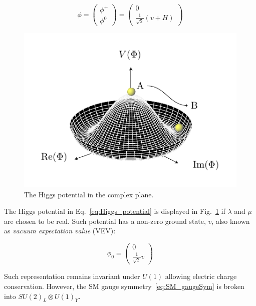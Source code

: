 			\begin{equation}
			\label{eq:Higgs_doublet}
				\phi = 
				\begin{pmatrix}
					\phi^+ \\ \phi^0
				\end{pmatrix} 
				=
				\begin{pmatrix}
					0 \\ \frac{1}{\sqrt{2}} \left ( v + H \right )
				\end{pmatrix}
			\end{equation}

			\begin{figure}
			\centering
				\includegraphics[width=.4\textwidth]{HiggsPotential/HiggsPotential}
			\caption{\label{fig:higgs_potential}The Higgs potential in the complex plane.} %
			\end{figure}

			The Higgs potential in Eq.~\ref{eq:Higgs_potential} is displayed in Fig.~\ref{fig:higgs_potential} if $\lambda$ and $\mu$ are chosen to be real. Such potential has a non-zero ground state, $v$, also known as \emph{vacuum expectation value} (VEV):

			\begin{equation}
			\label{eq:Higgs_vev}
				\phi_0 = 
				\begin{pmatrix}
					0 \\ \frac{1}{\sqrt{2}} v
				\end{pmatrix}
			\end{equation}

			\noindent Such representation remains invariant under $U(1)$ allowing electric charge conservation. However, the SM gauge symmetry~\ref{eq:SM_gaugeSym} is broken into $SU(2)_L \otimes U(1)_Y$.


